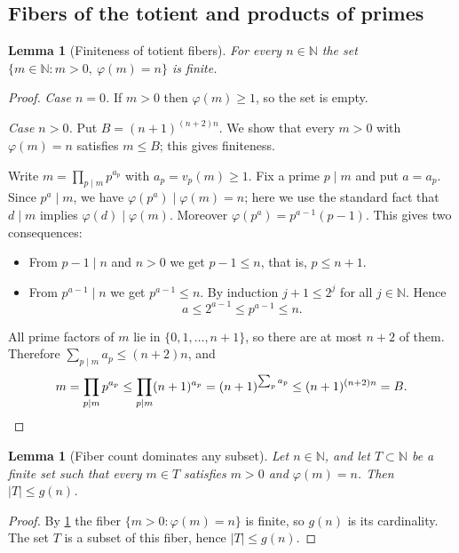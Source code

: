 \documentclass[11pt]{article}
\newtheorem{lemma}[theorem]{Lemma}
\theoremstyle{definition}
\theoremstyle{remark}
\begin{document}
\subsection{Fibers of the totient and products of primes}

\begin{lemma}[Finiteness of totient fibers]\label{lem:totient_fiber_finite}
For every $n\in\mathbb{N}$ the set $\{m\in\mathbb{N}: m>0,\ \varphi(m)=n\}$ is finite.
\end{lemma}

\begin{proof}
\emph{Case $n=0$.} If $m>0$ then $\varphi(m)\ge1$, so the set is empty.

\emph{Case $n>0$.} Put $B=(n+1)^{(n+2)n}$. We show that every $m>0$ with $\varphi(m)=n$ satisfies $m\le B$; this gives finiteness.

Write $m=\prod_{p\mid m}p^{a_p}$ with $a_p=v_p(m)\ge1$. Fix a prime $p\mid m$ and put $a=a_p$. Since $p^a\mid m$, we have $\varphi(p^a)\mid\varphi(m)=n$; here we use the standard fact that $d\mid m$ implies $\varphi(d)\mid\varphi(m)$. Moreover $\varphi(p^a)=p^{a-1}(p-1)$. This gives two consequences:

\begin{itemize}
\item From $p-1\mid n$ and $n>0$ we get $p-1\le n$, that is, $p\le n+1$.
\item From $p^{a-1}\mid n$ we get $p^{a-1}\le n$. By induction $j+1\le 2^j$ for all $j\in\mathbb{N}$. Hence
\[
a\le 2^{a-1}\le p^{a-1}\le n .
\]
\end{itemize}

All prime factors of $m$ lie in $\{0,1,\dots,n+1\}$, so there are at most $n+2$ of them. Therefore $\sum_{p\mid m}a_p\le (n+2)n$, and
\[
m=\prod_{p\mid m}p^{a_p}\le\prod_{p\mid m}(n+1)^{a_p}=(n+1)^{\sum_p a_p}\le (n+1)^{(n+2)n}=B. \qedhere
\]
\end{proof}

\begin{lemma}[Fiber count dominates any subset]\label{lem:card_le_totientFiberCard}
Let $n\in\mathbb{N}$, and let $T\subset\mathbb{N}$ be a finite set such that every $m\in T$ satisfies $m>0$ and $\varphi(m)=n$. Then $|T|\le g(n)$.
\end{lemma}

\begin{proof}
By \cref{lem:totient_fiber_finite} the fiber $\{m>0:\varphi(m)=n\}$ is finite, so $g(n)$ is its cardinality. The set $T$ is a subset of this fiber, hence $|T|\le g(n)$.
\end{proof}
\end{document}
